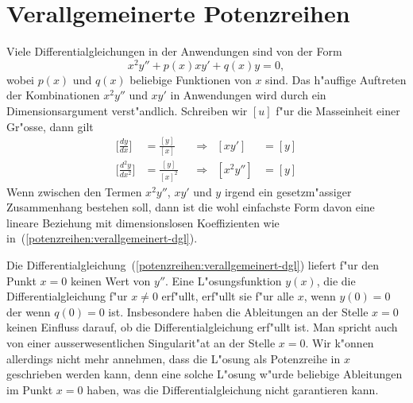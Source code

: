 \section{Verallgemeinerte Potenzreihen
\label{section:potenzreihen:verallgemeinert}}
Viele Differentialgleichungen in der Anwendungen sind von der Form
\begin{equation}
x^2y''+p(x)xy'+q(x)y=0,
\label{potenzreihen:verallgemeinert-dgl}
\end{equation}
wobei $p(x)$ und $q(x)$ beliebige Funktionen von $x$ sind.
Das h"auffige Auftreten der Kombinationen $x^2y''$ und $xy'$ in Anwendungen
wird durch ein Dimensionsargument verst"andlich.
Schreiben wir $[u]$ f"ur die Masseinheit einer Gr"osse, dann gilt
\begin{equation*}
\begin{aligned}
\biggl[\frac{dy}{dx}\biggr]
&=
\frac{[y]}{[x]}
&
&\Rightarrow&
[xy']&=[y]\\
\biggl[\frac{d^2y}{dx^2}\biggr]
&=
\frac{[y]}{[x]^2}
&
&\Rightarrow&
[x^2y'']&=[y]
\end{aligned}
\end{equation*}
Wenn zwischen den Termen $x^2y''$, $xy'$ und $y$ irgend ein
gesetzm"assiger Zusammenhang bestehen soll, dann ist die wohl
einfachste Form davon eine lineare Beziehung mit dimensionslosen
Koeffizienten wie in~(\ref{potenzreihen:verallgemeinert-dgl}).

Die Differentialgleichung~(\ref{potenzreihen:verallgemeinert-dgl})
liefert f"ur den Punkt $x=0$ keinen Wert von $y''$.
Eine L"osungsfunktion $y(x)$, die die Differentialgleichung f"ur
$x\ne 0$ erf"ullt, erf"ullt sie f"ur alle $x$, wenn $y(0)=0$ der
wenn $q(0)=0$ ist. 
Insbesondere haben die Ableitungen an der Stelle $x=0$ keinen
Einfluss darauf, ob die Differentialgleichung erf"ullt ist.
Man spricht auch von einer ausserwesentlichen Singularit"at an
der Stelle $x=0$.
Wir k"onnen allerdings nicht mehr annehmen, dass die L"osung als
Potenzreihe in $x$ geschrieben werden kann, denn eine solche
L"osung w"urde beliebige Ableitungen im Punkt $x=0$ haben, was 
die Differentialgleichung nicht garantieren kann.

